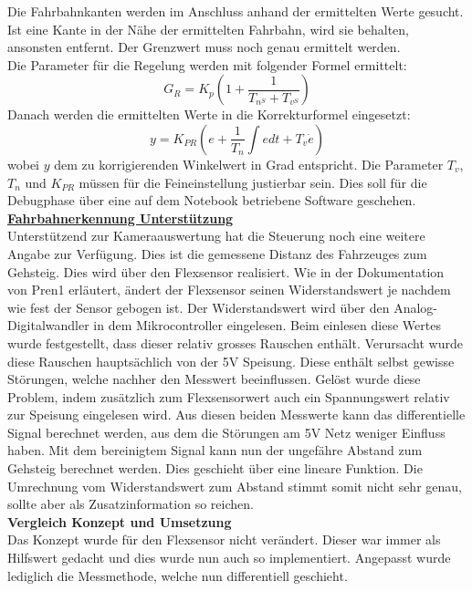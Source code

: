Die Fahrbahnkanten werden im Anschluss anhand der ermittelten Werte gesucht. Ist eine Kante in der Nähe der ermittelten Fahrbahn, wird sie behalten, ansonsten entfernt. Der Grenzwert muss noch genau ermittelt werden.\\
Die Parameter für die Regelung werden mit folgender Formel ermittelt:
\[
G_R = K_p\left(1 + \frac{1}{T_{n^S} + T_{v^S}}\right)
\]
Danach werden die ermittelten Werte in die Korrekturformel eingesetzt:
\[
y = K_{PR}\left(e + \frac{1}{T_n}\int{edt} + T_v\dot{e}\right)
\]
wobei $y$ dem zu korrigierenden Winkelwert in Grad entspricht. Die Parameter $T_v$, $T_n$ und $K_{PR}$ müssen für die Feineinstellung justierbar sein. Dies soll für die Debugphase über eine auf dem Notebook betriebene Software geschehen.
\newpage
\underline{\textbf{Fahrbahnerkennung Unterstützung}}\\[0.2cm]
Unterstützend zur Kameraauswertung hat die Steuerung noch eine weitere Angabe zur Verfügung. Dies ist die gemessene Distanz des Fahrzeuges zum Gehsteig. Dies wird über den Flexsensor realisiert. Wie in der Dokumentation von Pren1 erläutert, ändert der Flexsensor seinen Widerstandswert je nachdem wie fest der Sensor gebogen ist. Der Widerstandswert wird über den Analog-Digitalwandler in dem Mikrocontroller eingelesen. Beim einlesen diese Wertes wurde festgestellt, dass dieser relativ grosses Rauschen enthält. Verursacht wurde diese Rauschen hauptsächlich von der 5V Speisung. Diese enthält selbst gewisse Störungen, welche nachher den Messwert beeinflussen. Gelöst wurde diese Problem, indem zusätzlich zum Flexsensorwert auch ein Spannungswert relativ zur Speisung eingelesen wird. Aus diesen beiden Messwerte kann das differentielle Signal berechnet werden, aus dem die Störungen am 5V Netz weniger Einfluss haben. Mit dem bereinigtem Signal kann nun der ungefähre Abstand zum Gehsteig berechnet werden. Dies geschieht über eine lineare Funktion. Die Umrechnung vom Widerstandswert zum Abstand stimmt somit nicht sehr genau, sollte aber als Zusatzinformation so reichen.%
\\[0.2cm]
\textbf{Vergleich Konzept und Umsetzung}\\[0.2cm]
Das Konzept wurde für den Flexsensor nicht verändert. Dieser war immer als Hilfswert gedacht und dies wurde nun auch so implementiert. Angepasst wurde lediglich die Messmethode, welche nun differentiell geschieht.